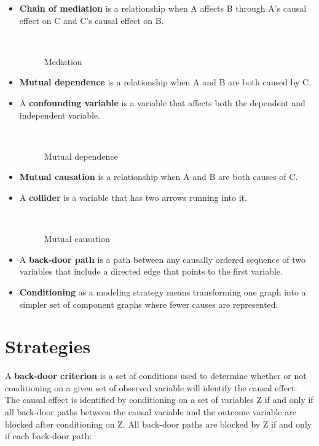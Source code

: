 \begin{itemize}

\item \textbf{Chain of mediation} is a relationship when A affects B through A's causal effect on C and C's causal effect on B.

\begin{figure}[htp]\centering
\caption{Mediation}\
\end{figure}

\item \textbf{Mutual dependence} is a relationship when A and B are both caused by C.

\item A \textbf{confounding variable} is a variable that affects both the dependent and independent variable.

\begin{figure}[htp]\centering
\caption{Mutual dependence}\
\end{figure}

\item \textbf{Mutual causation} is a relationship when A and B are both causes of C. 

\item A \textbf{collider} is a variable that has two arrows running into it.

\begin{figure}[htp]\centering
\caption{Mutual causation}\
\end{figure}

\item A \textbf{back-door path} is a path between any causally ordered sequence  of two variables that include a directed edge that points to the first variable. 

\item \textbf{Conditioning} as a modeling strategy means transforming one graph into a simpler set of component graphs where fewer causes are represented.

\end{itemize}

\section*{Strategies}

A \textbf{back-door criterion} is a set of conditions used to determine whether or not conditioning on a given set of observed variable will identify the causal effect. The causal effect is identified by conditioning on a set of variables Z if and only if all back-door paths between the causal variable and the outcome variable are blocked after conditioning on Z. All back-door paths are blocked by Z if and only if each back-door path:

